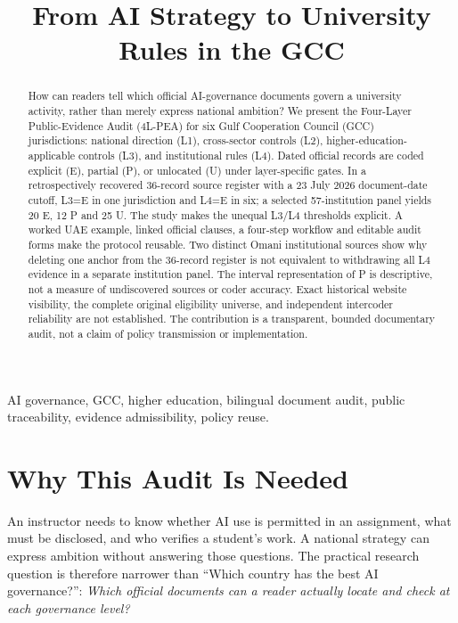 \documentclass[conference,letterpaper]{IEEEtran}
\begin{document}
\title{From AI Strategy to University Rules in the GCC}
\author{}
\maketitle
\begin{abstract}
How can readers tell which official AI-governance documents govern a university activity, rather than merely express national ambition? We present the Four-Layer Public-Evidence Audit (4L-PEA) for six Gulf Cooperation Council (GCC) jurisdictions: national direction (L1), cross-sector controls (L2), higher-education-applicable controls (L3), and institutional rules (L4). Dated official records are coded explicit (E), partial (P), or unlocated (U) under layer-specific gates. In a retrospectively recovered 36-record source register with a 23 July 2026 document-date cutoff, L3=E in one jurisdiction and L4=E in six; a selected 57-institution panel yields 20 E, 12 P and 25 U. The study makes the unequal L3/L4 thresholds explicit. A worked UAE example, linked official clauses, a four-step workflow and editable audit forms make the protocol reusable. Two distinct Omani institutional sources show why deleting one anchor from the 36-record register is not equivalent to withdrawing all L4 evidence in a separate institution panel. The interval representation of P is descriptive, not a measure of undiscovered sources or coder accuracy. Exact historical website visibility, the complete original eligibility universe, and independent intercoder reliability are not established. The contribution is a transparent, bounded documentary audit, not a claim of policy transmission or implementation.
\end{abstract}
\begin{IEEEkeywords}
AI governance, GCC, higher education, bilingual document audit, public traceability, evidence admissibility, policy reuse.
\end{IEEEkeywords}

\section{Why This Audit Is Needed}
An instructor needs to know whether AI use is permitted in an assignment, what must be disclosed, and who verifies a student's work. A national strategy can express ambition without answering those questions. The practical research question is therefore narrower than ``Which country has the best AI governance?'': \emph{Which official documents can a reader actually locate and check at each governance level?}
\end{document}

